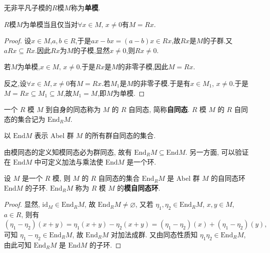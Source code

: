 \documentclass[../../main.tex]{subfiles}%
\begin{document}
\begin{definition}[单模]
无非平凡子模的$R$模$M$称为\textbf{单模}.
\end{definition}

\begin{theorem}
$R$模$M$为单模当且仅当对$\forall x\in M,\,x\neq 0$有$M=Rx$.
\end{theorem}
\begin{proof}
设$x\in M$,$a,b\in R$,于是$ax-bx=(a-b)x\in Rx$,故$Rx$是$M$的子群.又 $aRx\subseteq Rx$.因此$Rx$为$M$的子模,显然$x\neq 0$,则$Rx\neq 0$.

若$M$为单模,$x\in M,\,x\neq 0$.于是$Rx$是$M$的非零子模,因此$M=Rx$.

反之,设$\forall x\in M,x\neq 0$有$M=Rx$.若$M_1$是$M$的非零子模.于是有$x\in M_1$, $x\neq 0$.于是$M=Rx\subseteq M_1\subseteq M$,故$M_1=M$,即$M$为单模.
\end{proof}

\begin{definition}
一个 \( R \) 模 \( M \) 到自身的同态称为 \( M \) 的 \( R \) 自同态, 简称\textbf{自同态}. \( R \) 模 \( M \) 的 \( R \) 自同态的集合记为 \( \text{End}_R M \). 

以 \( \text{End}M \) 表示 Abel 群 \( M \) 的所有群自同态的集合.
\end{definition}
\begin{remark}
由模同态的定义知模同态必为群同态, 故有 \( \text{End}_R M \subseteq \text{End}M \). 另一方面, 可以验证在 \( \text{End}M \) 中可定义加法与乘法使 \( \text{End}M \) 是一个环. 
\end{remark}

\begin{theorem}\label{theorem:抽象代数-定理 1.6.2}
设 \( M \) 是一个 \( R \) 模, 则 \( M \) 的 \( R \) 自同态的集合 \( \text{End}_R M \) 是 Abel 群 \( M \) 的自同态环 \( \text{End}M \) 的子环. \( \text{End}_R M \) 称为 \( R \) 模 \( M \) 的\textbf{模自同态环}.
\end{theorem}
\begin{proof}
显然, \( \text{id}_M \in \text{End}_R M \), 故 \( \text{End}_R M \neq \varnothing \), 又若 \( \eta_1, \eta_2 \in \text{End}_R M \), \( x, y \in M \), \( a \in R \), 则有
\[
(\eta_1 - \eta_2)(x + y) = \eta_1(x + y) - \eta_2(x + y) = (\eta_1 - \eta_2)(x) + (\eta_1 - \eta_2)(y),
\]
可知 \( \eta_1 - \eta_2 \in \text{End}_R M \), 故 \( \text{End}_R M \) 对加法成群. 又由同态性质知 \( \eta_1\eta_2 \in \text{End}_R M \), 由此可知 \( \text{End}_R M \) 是 \( \text{End}M \) 的子环.
\end{proof}
\end{document}
